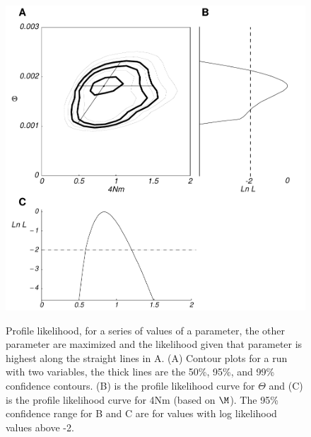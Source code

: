 \begin{figure}[htb]
\begin{center}
\leavevmode
\hbox{%
\includegraphics[scale=0.6]{mim/profile_real}}%
\end{center}
\caption{{Profile likelihood, for a series of values of a parameter, the other parameter are maximized and the likelihood given that parameter is highest along the straight lines in A. (A) Contour plots for a run with two variables,
the thick lines are the 50\%, 95\%, and 99\% confidence contours. (B) is the
profile likelihood curve for $\Theta$ and (C) is the profile likelihood curve
for 4Nm (based on $\M$). The 95\% confidence range for B and C are for values 
with log likelihood values above -2.} 
\label{PROFILEFIG}}
\end{figure}

\newpage